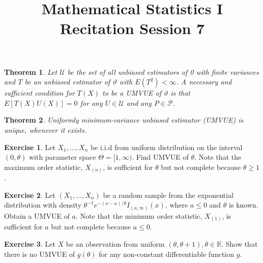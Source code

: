 \documentclass{article}
\title{Mathematical Statistics I\\ Recitation Session 7}
\date{}
\newtheorem*{theorem*}{Theorem}
\theoremstyle{definition}
\newtheorem*{exercise*}{Exercise}
\begin{document}
	\maketitle
	
	\begin{theorem*}
		Let $\mathcal{U}$ be the set of all unbiased estimators of 0 with finite variances and $T$ be an unbiased estimator of $\vartheta$ with $E\left(T^2\right)<\infty$. A necessary and sufficient condition for $T(X)$ to be a UMVUE of $\vartheta$ is that $E[T(X) U(X)]=0$ for any $U \in \mathcal{U}$ and any $P \in \mathcal{P}$.
	\end{theorem*}
	
	\begin{theorem*}
		Uniformly minimum-variance unbiased estimator (UMVUE) is unique, whenever it exists.
	\end{theorem*}
	
	\begin{exercise*}
		Let $X_1, \ldots, X_n$ be i.i.d from uniform distribution on the interval $(0,\theta)$ with parameter space $\Theta = [1,\infty)$. Find UMVUE of $\theta$. Note that the maximum order statistic, $X_{(n)}$, is sufficient for $\theta$ but not complete because $\theta \geq 1$.
	\end{exercise*}
	
	\begin{exercise*}
		Let $\left(X_1, \ldots, X_n\right)$ be a random sample from the exponential distribution with density $\theta^{-1} e^{-(x-a) / \theta} I_{(a, \infty)}(x)$, where $a \leq 0$ and $\theta$ is known. Obtain a UMVUE of $a$.
		Note that the minimum order statistic, $X_{(1)}$, is sufficient for $a$ but not complete because $a \leq 0$.
	\end{exercise*}
	 
	\begin{exercise*}
	Let $X$ be an observation from uniform $(\theta, \theta+1), \theta \in \mathbb{R}$. Show that there is no UMVUE of $g(\theta)$ for any non-constant differentiable function $g$.
	\end{exercise*}
	
\end{document}
